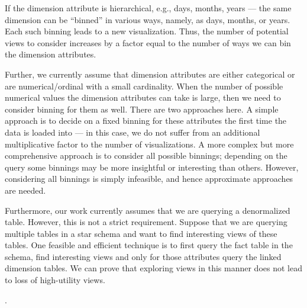  
 
 
If the dimension attribute is hierarchical, e.g., days, months, years ---
 the same dimension can be ``binned'' in various ways, namely, 
 as days, months, or years. 
 Each such binning leads to a new visualization.
Thus, the number of potential views to consider increases 
by a factor equal to the number of ways we can bin the dimension attributes.

 Further, we currently assume that dimension attributes are either categorical or are
 numerical/ordinal with a small cardinality.
 When the number of possible numerical values the dimension attributes
 can take is large, then we need to consider binning for them as well.
 There are two approaches here. 
  A simple approach is to decide on a fixed binning for these attributes the
 first time the data is loaded into \SeeDB --- in this case, 
 we do not suffer from an additional multiplicative factor to the number of
 visualizations.
 A more complex but more comprehensive approach is to consider all possible binnings;
 depending on the query some binnings may be more insightful or interesting than others. However, considering all binnings is simply infeasible, and hence
 approximate approaches are needed.

 
 Furthermore, our work currently assumes that we are querying a denormalized
 table.
 However, this is not a strict requirement. 
 Suppose that we are querying multiple tables in a star schema and want to find
 interesting views of these tables.
 One feasible and efficient technique is to first query the fact table in the
 schema, find interesting views and only for those attributes query the
 linked dimension tables.
 We can prove that exploring views in this manner does not lead to loss of
 high-utility views.

.
